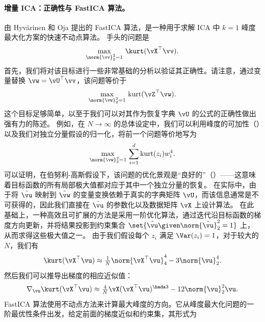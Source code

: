 \documentclass[../../book-main_zh.tex]{subfiles}
\begin{document}
\paragraph{增量 ICA：正确性与 FastICA 算法。}
由 Hyv\"{a}rinen 和 Oja \cite{hyvarinen-1997} 提出的 FastICA 算法，是一种用于求解
ICA 中 $k=1$ 峰度最大化方案的快速不动点算法。
手头的问题是
\begin{equation}\label{eq:kurtosis-maximization-sphere-finitesample}
    \max_{\norm{\vv}_2^2 = 1}\, \kurt(\vX^\top \vv).
\end{equation}
首先，我们将对该目标进行一些非常基础的分析以验证其正确性。请注意，通过变量替换 $\vw =
\vU^\top \vv$，该问题等价于
\begin{equation*}
    \max_{\norm{\vw}_2^2 = 1}\,
    \mathrm{kurt}(\vZ^\top \vw).
\end{equation*}
这个目标足够简单，以至于我们可以对其作为恢复字典 $\vU$ 的公式的正确性做出强有力的陈述。
例如，在 $N \to \infty$
的总体设定中，我们可以利用峰度的可加性（）以及我们对独立分量假设的归一化，将前一个问题等价地写为
\begin{equation}\label{eq:kurtosis-maximization-sphere-population-simple}
    \max_{\norm{\vw}_2^2 = 1}\,
    \sum_{i=1}^d \mathrm{kurt}(z_i) w_i^4.
\end{equation}
可以证明，在伯努利-高斯假设下，该问题的优化景观是“良好的”（）——这意味着目标函数的所有局部极大值都对应于其中一个独立分量的恢复。
在实际中，由于将 $\tilde{\vu}$ 映射到 $\tilde{\vw}$ 的变量变换依赖于真实的字典矩阵 $\vU$，而该信息通常是不可获得的，因此我们直接在 $\tilde{\vu}$ 的参数化以及数据矩阵 $\vX$ 上设计算法。
在此基础上，一种高效且可扩展的方法是采用一阶优化算法，通过迭代沿目标函数的梯度方向更新，并将结果投影到约束集合 $\set{\tilde{\vu} \given \norm{\tilde{\vu}}_2^2 = 1}$ 上，从而求得这些极大值之一。
由于我们假设每个 $z_i$ 满足 $\Var(z_i)=1$，对于较大的 $N$，我们有
\begin{equation}\label{eq:kurtosis-approximation-l4}
    \kurt(\vX^\top \vu)
    \approx
    \tfrac{1}{N} \norm{\vX^\top \vu}_4^4 - 3 \norm{\vu}_2^4.
\end{equation}
然后我们可以推导出梯度的相应近似值：
\begin{equation*}
    \nabla_{\vu} \kurt(\vX^\top \vu)
    \approx
    \tfrac{4}{N} \vX (\vX^\top \vu)^{\hada 3}
    - 12 \norm{\vu}_2^2 \vu.
\end{equation*}
FastICA 算法使用不动点方法来计算最大峰度的方向。它从峰度最大化问题的一阶最优性条件出发，给定前面的梯度近似和约束集，其形式为
\end{document}
